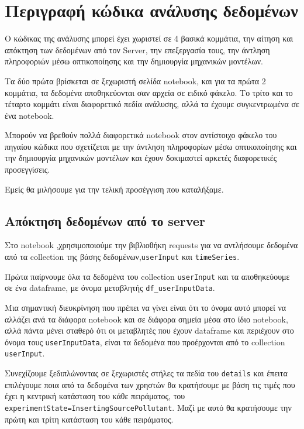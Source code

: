  \section{Περιγραφή κώδικα ανάλυσης δεδομένων}

Ο κώδικας της ανάλυσης μπορεί έχει χωριστεί σε 4 βασικά κομμάτια, την αίτηση και απόκτηση των δεδομένων από τον Server,
την επεξεργασία τους, την άντληση πληροφοριών μέσω οπτικοποίησης και την δημιουργία μηχανικών μοντέλων.


Τα δύο πρώτα βρίσκεται σε ξεχωριστή σελίδα notebook, και για τα πρώτα 2 κομμάτια, τα δεδομένα αποθηκεύονται σαν αρχεία σε ειδικό φάκελο.
Το τρίτο και το τέταρτο κομμάτι είναι διαφορετικό πεδία ανάλυσης, αλλά τα έχουμε συγκεντρωμένα σε ένα notebook.

Μπορούν να βρεθούν πολλά διαφορετικά notebook στον αντίστοιχο φάκελο του πηγαίου κώδικα που
σχετίζεται με την άντληση πληροφορίων μέσω οπτικοποίησης και την δημιουργία μηχανικών μοντέλων και έχουν δοκιμαστεί
αρκετές διαφορετικές προσεγγίσεις.

Εμείς θα μιλήσουμε για την τελική προσέγγιση που καταλήξαμε.

\subsection{Απόκτηση δεδομένων από το server}

Στο notebook \texttt{},χρησιμοποιούμε την βιβλιοθήκη requests για να αντλήσουμε
δεδομένα από τα collection της βάσης δεδομένων,\texttt{\linebreak userInput} και \texttt{timeSeries}.

Πρώτα παίρνουμε όλα τα δεδομένα του collection \texttt{userInput}
και τα αποθηκεύουμε σε ένα dataframe, με όνομα μεταβλητής \texttt{df\_userInputData}.

Μια σημαντική διευκρίνηση που πρέπει να γίνει είναι ότι το όνομα αυτό μπορεί να αλλάζει ανά τα διάφορα notebook 
και σε διάφορα σημεία μέσα στο ίδιο notebook,
αλλά πάντα μένει σταθερό ότι οι μεταβλητές που έχουν dataframe και περιέχουν στο όνομα τους \texttt{userInputData},
είναι τα δεδομένα που προέρχονται από το collection \texttt{userInput}.

Συνεχίζουμε ξεδιπλώνοντας σε ξεχωριστές στήλες τα πεδία του \texttt{details} 
και έπειτα επιλέγουμε ποια από τα δεδομένα των χρηστών θα κρατήσουμε με βάση τις τιμές 
που έχει η κεντρική κατάσταση του κάθε πειράματος, του \texttt{experimentState=\linebreak InsertingSourcePollutant}.
Μαζί με αυτό θα κρατήσουμε την πρώτη και τρίτη κατάσταση του κάθε πειράματος.

